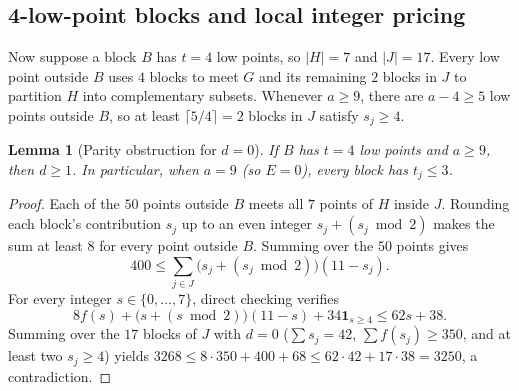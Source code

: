 \documentclass[11pt,a4paper]{article}
\newtheorem{lemma}[theorem]{Lemma}
\theoremstyle{definition}
\theoremstyle{remark}
\begin{document}
\subsection{4-low-point blocks and local integer pricing}\label{sec:four_low}

Now suppose a block $B$ has $t = 4$ low points, so $|H| = 7$ and $|J| = 17$. Every low point outside $B$ uses $4$ blocks to meet $G$ and its remaining $2$ blocks in $J$ to partition $H$ into complementary subsets. Whenever $a \ge 9$, there are $a - 4 \ge 5$ low points outside $B$, so at least $\lceil 5/4 \rceil = 2$ blocks in $J$ satisfy $s_j \ge 4$.

\begin{lemma}[Parity obstruction for $d=0$]\label{lem:parity_d0}
If $B$ has $t = 4$ low points and $a \ge 9$, then $d \ge 1$. In particular, when $a = 9$ (so $E = 0$), every block has $t_j \le 3$.
\end{lemma}

\begin{proof}
Each of the $50$ points outside $B$ meets all $7$ points of $H$ inside $J$. Rounding each block's contribution $s_j$ up to an even integer $s_j + (s_j \bmod 2)$ makes the sum at least $8$ for every point outside $B$. Summing over the $50$ points gives
\[
  400 \le \sum_{j \in J} \bigl(s_j + (s_j \bmod 2)\bigr)(11 - s_j).
\]
For every integer $s \in \{0,\dots,7\}$, direct checking verifies
\[
  8f(s) + \bigl(s + (s \bmod 2)\bigr)(11 - s) + 34\mathbf{1}_{s \ge 4} \le 62s + 38.
\]
Summing over the $17$ blocks of $J$ with $d = 0$ ($\sum s_j = 42$, $\sum f(s_j) \ge 350$, and at least two $s_j \ge 4$) yields $3268 \le 8\cdot 350 + 400 + 68 \le 62\cdot 42 + 17\cdot 38 = 3250$, a contradiction.
\end{proof}
\end{document}
